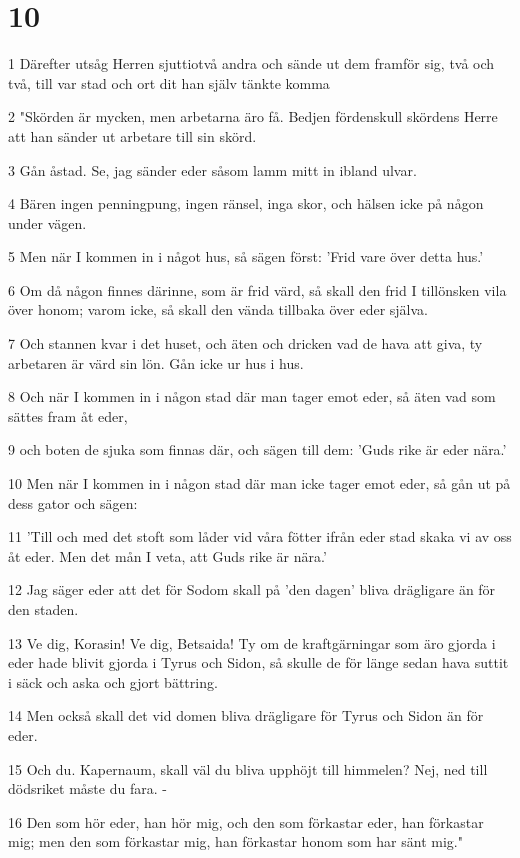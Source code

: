 \chapter{10}

\par 1 Därefter utsåg Herren sjuttiotvå andra och sände ut dem framför sig, två och två, till var stad och ort dit han själv tänkte komma
\par 2 "Skörden är mycken, men arbetarna äro få. Bedjen fördenskull skördens Herre att han sänder ut arbetare till sin skörd.
\par 3 Gån åstad. Se, jag sänder eder såsom lamm mitt in ibland ulvar.
\par 4 Bären ingen penningpung, ingen ränsel, inga skor, och hälsen icke på någon under vägen.
\par 5 Men när I kommen in i något hus, så sägen först: 'Frid vare över detta hus.'
\par 6 Om då någon finnes därinne, som är frid värd, så skall den frid I tillönsken vila över honom; varom icke, så skall den vända tillbaka över eder själva.
\par 7 Och stannen kvar i det huset, och äten och dricken vad de hava att giva, ty arbetaren är värd sin lön. Gån icke ur hus i hus.
\par 8 Och när I kommen in i någon stad där man tager emot eder, så äten vad som sättes fram åt eder,
\par 9 och boten de sjuka som finnas där, och sägen till dem: 'Guds rike är eder nära.'
\par 10 Men när I kommen in i någon stad där man icke tager emot eder, så gån ut på dess gator och sägen:
\par 11 'Till och med det stoft som låder vid våra fötter ifrån eder stad skaka vi av oss åt eder. Men det mån I veta, att Guds rike är nära.'
\par 12 Jag säger eder att det för Sodom skall på 'den dagen' bliva drägligare än för den staden.
\par 13 Ve dig, Korasin! Ve dig, Betsaida! Ty om de kraftgärningar som äro gjorda i eder hade blivit gjorda i Tyrus och Sidon, så skulle de för länge sedan hava suttit i säck och aska och gjort bättring.
\par 14 Men också skall det vid domen bliva drägligare för Tyrus och Sidon än för eder.
\par 15 Och du. Kapernaum, skall väl du bliva upphöjt till himmelen? Nej, ned till dödsriket måste du fara. -
\par 16 Den som hör eder, han hör mig, och den som förkastar eder, han förkastar mig; men den som förkastar mig, han förkastar honom som har sänt mig."
